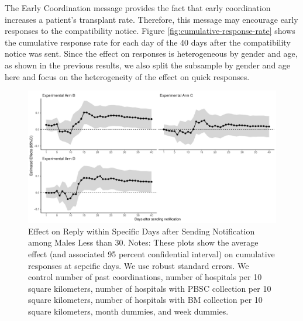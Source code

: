 \documentclass[
]{article}
\begin{document}
The Early Coordination message provides the fact that early coordination increases a patient's transplant rate. Therefore, this message may encourage early responses to the compatibility notice. Figure \ref{fig:cumulative-response-rate} shows the cumulative response rate for each day of the 40 days after the compatibility notice was sent. Since the effect on responses is heterogeneous by gender and age, as shown in the previous results, we also split the subsample by gender and age here and focus on the heterogeneity of the effect on quick responses.

\begin{figure}[t]
\includegraphics{body_files/figure-latex/young-male-flow-1} \caption{Effect on Reply within Specific Days after Sending Notification among Males Less than 30. Notes: These plots show the average effect (and associated 95 percent confidential interval) on cumulative responses at sepcific days. We use robust standard errors. We control number of past coordinations, number of hospitals per 10 square kilometers, number of hospitals with PBSC collection per 10 square kilometers, number of hospitals with BM collection per 10 square kilometers, month dummies, and week dummies.}\label{fig:young-male-flow}
\end{figure}
\end{document}

